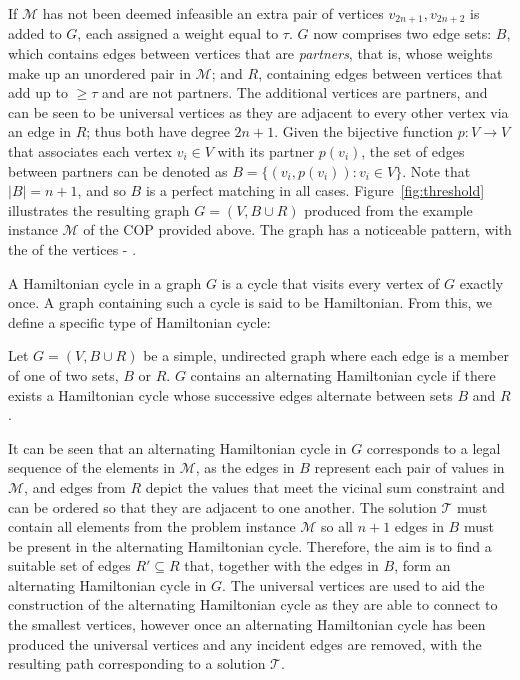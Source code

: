 \documentclass[authoryear]{elsarticle}
\begin{document}
If $\mathcal{M}$ has not been deemed infeasible an extra pair of vertices $v_{2n+1}, v_{2n+2}$ is added to $G$, each assigned a weight equal to $\tau$. $G$ now comprises two edge sets: $B$, which contains  edges between vertices that are \emph{partners}, that is, whose weights make up an unordered pair in $\mathcal{M}$; and $R$, containing  edges between vertices that add up to $\geq \tau$ and are not partners. The additional vertices are partners, and can be seen to be universal vertices as they are adjacent to every other vertex via an edge in $R$; thus both have degree $2n+1$. Given the bijective function $p : V \to V$ that associates each vertex $v_i \in V$ with its partner $p(v_i)$, the set of edges between partners can be denoted as $B = \{(v_i, p(v_i)) : v_i \in V\}$. Note that $|B| = n+1$, and so $B$ is a perfect matching in all cases. Figure~\ref{fig:threshold} illustrates the resulting graph $G = (V, B \cup R)$ produced from the example instance $\mathcal{M}$ of the COP provided above. The graph has a noticeable pattern, with the  of the vertices - .

A Hamiltonian cycle in a graph $G$ is a cycle that visits every vertex of $G$ exactly once. A graph containing such a cycle is said to be Hamiltonian. From this, we define a specific type of Hamiltonian cycle:

\begin{definition} %
	\label{defn:althamcycle}
	Let $G = (V, B \cup R)$ be a simple, undirected graph where each edge is a member of one of two sets, $B$ or $R$. $G$ contains an alternating Hamiltonian cycle if there exists a Hamiltonian cycle whose successive edges alternate between sets $B$ and $R$.
\end{definition}

\noindent It can be seen that an alternating Hamiltonian cycle in $G$ corresponds to a legal sequence of the elements in $\mathcal{M}$, as the edges in $B$ represent each pair of values in $\mathcal{M}$, and edges from $R$ depict the values that meet the vicinal sum constraint and can be ordered so that they are adjacent to one another. The solution $\mathcal{T}$ must contain all elements from the problem instance $\mathcal{M}$ so all $n+1$ edges in $B$ must be present in the alternating Hamiltonian cycle. Therefore, the aim is to find a suitable set of edges $R' \subseteq R$ that, together with the edges in $B$, form an alternating Hamiltonian cycle in $G$. The universal vertices are used to aid the construction of the alternating Hamiltonian cycle as they are able to connect to the smallest vertices, however once an alternating Hamiltonian cycle has been produced the universal vertices and any incident edges are removed, with the resulting path corresponding to a solution $\mathcal{T}$.
\end{document}
